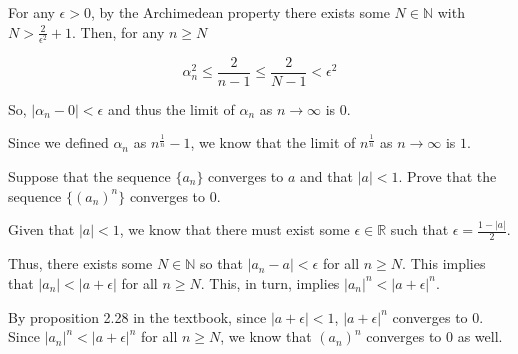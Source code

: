 \documentclass[addpoints]{exam}
\begin{document}
\begin{questions}
For any $\epsilon > 0$, by the Archimedean property there exists some $N \in \mathbb{N}$ with
$N > \frac{2}{\epsilon^2} + 1$. Then, for any $n \geq N$

\[\alpha_n^2 \leq \frac{2}{n - 1} \leq \frac{2}{N - 1} < \epsilon^2\]

So, $|\alpha_n - 0| < \epsilon$ and thus the limit of $\alpha_n$ as $n \to \infty$ is $0$.

Since we defined $\alpha_n$ as $n^{\frac{1}{n}} - 1$, we know that the limit of
$n^{\frac{1}{n}}$ as $n \to \infty$ is $1$.

\question Suppose that the sequence $\{a_n\}$ converges to $a$ and that $|a| < 1$. 
Prove that the sequence $\{(a_n)^n\}$ converges to 0. 

Given that $|a| < 1$, we know that there must exist some $\epsilon \in \mathbb{R}$ such that
$\epsilon = \frac{1 - |a|}{2}$. 

Thus, there exists some $N \in \mathbb{N}$ so that $|a_n - a| < \epsilon$ for all $n \geq N$. This
implies that $|a_n| < |a + \epsilon|$ for all $n \geq N$. This, in turn, implies 
$|a_n|^n < |a + \epsilon|^n$.

By proposition 2.28 in the textbook, since $|a + \epsilon| < 1$, $|a + \epsilon|^n$ converges to 0. Since
$|a_n|^n < |a + \epsilon|^n$ for all $n \geq N$, we know that $(a_n)^n$ converges to 0 as well. 

\end{questions}
\end{document}
